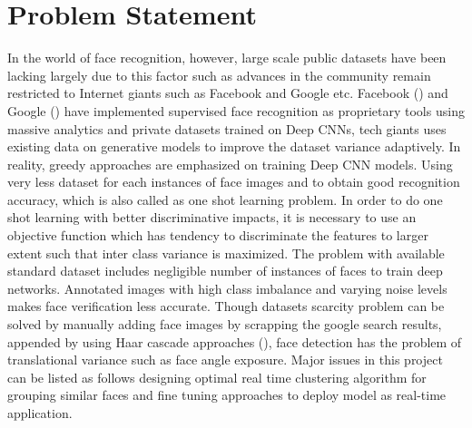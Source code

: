 \documentclass[a4paper,12pt, twoside]{NITKReport}
\begin{document}
\section{Problem Statement}
\label{prob}
	 In the world of face recognition, however, large scale public datasets have been lacking largely due to this factor such as advances in the community remain restricted to Internet giants such as Facebook and Google etc. Facebook (\cite{1}) and Google (\cite{2}) have implemented supervised face recognition as proprietary tools using massive analytics and private datasets trained on Deep CNNs, tech giants uses existing data on generative models to improve the dataset variance adaptively. In reality, greedy approaches are emphasized on training Deep CNN models. Using very less dataset for each instances of face images and to obtain good recognition accuracy, which is also called as one shot learning problem. In order to do one shot learning with better discriminative impacts, it is necessary to use an objective function which has tendency to discriminate the features to larger extent such that inter class variance is maximized. The problem with available standard dataset includes negligible number of instances of faces to train deep networks. Annotated images with high class imbalance and varying noise levels makes face verification less accurate. Though datasets scarcity problem can be solved by manually adding face images by scrapping the google search results, appended by using Haar cascade approaches (\cite{viola2001rapid}), face detection has the problem of translational variance such as face angle exposure. Major issues in this project can be listed as follows designing optimal real time clustering algorithm for grouping similar faces and fine tuning approaches to deploy model as real-time application.

		
\end{document}
